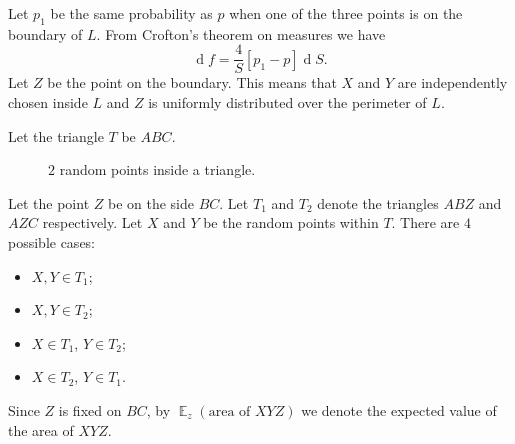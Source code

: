 \documentclass{article}
\DeclareMathOperator{\dif}{d}
\DeclareMathOperator{\E}{\mathbb{E}}
\begin{document}
Let $p_{1}$ be the same probability as $p$ when one of the three points is on the boundary of $L$.
From Crofton's theorem on measures \cite{geom} we have
\begin{equation*}
    \dif f = \frac{4}{S}[p_{1} - p]\dif S.
\end{equation*}
Let $Z$ be the point on the boundary.
This means that $X$ and $Y$ are independently chosen inside $L$ and $Z$ is uniformly distributed over the perimeter of $L$.

Let the triangle $T$ be $ABC$.
\begin{figure}[h!]
    \centering
    \caption{$2$ random points inside a triangle.}
\end{figure}
Let the point $Z$ be on the side $BC$.
Let $T_{1}$ and $T_{2}$ denote the triangles $ABZ$ and $AZC$ respectively.
Let $X$ and $Y$ be the random points within $T$.
There are $4$ possible cases:
\begin{itemize}
    \item $X, Y \in T_{1}$;
    \item $X, Y \in T_{2}$;
    \item $X\in T_{1}$, $Y\in T_{2}$;
    \item $X\in T_{2}$, $Y\in T_{1}$.
\end{itemize}
Since $Z$ is fixed on $BC$, by $\E_{z}(\text{area of }XYZ)$ we denote the expected value of the area of $XYZ$.
\end{document}
